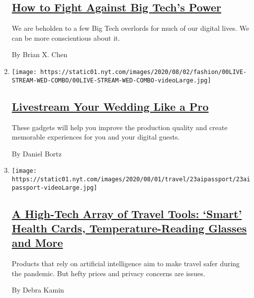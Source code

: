 \begin{enumerate}
  \hypertarget{how-to-fight-against-big-techs-power}{%
  \subsection{\texorpdfstring{\href{/2020/07/29/technology/personaltech/big-tech-power-how-to-fight.html}{How
  to Fight Against Big Tech's
  Power}}{How to Fight Against Big Tech's Power}}\label{how-to-fight-against-big-techs-power}}

  We are beholden to a few Big Tech overlords for much of our digital
  lives. We can be more conscientious about it.

  By Brian X. Chen
\item
  \texttt{[image: https://static01.nyt.com/images/2020/08/02/fashion/00LIVE-STREAM-WED-COMBO/00LIVE-STREAM-WED-COMBO-videoLarge.jpg]}

  \hypertarget{livestream-your-wedding-like-a-pro}{%
  \subsection{\texorpdfstring{\href{/2020/07/28/fashion/weddings/livestream-your-wedding-like-a-pro.html}{Livestream
  Your Wedding Like a
  Pro}}{Livestream Your Wedding Like a Pro}}\label{livestream-your-wedding-like-a-pro}}

  These gadgets will help you improve the production quality and create
  memorable experiences for you and your digital guests.

  By Daniel Bortz
\item
  \texttt{[image: https://static01.nyt.com/images/2020/08/01/travel/23aipassport/23aipassport-videoLarge.jpg]}

  \hypertarget{a-high-tech-array-of-travel-tools-smart-health-cards-temperature-reading-glasses-and-more}{%
  \subsection{\texorpdfstring{\href{/2020/07/23/travel/artificial-intelligence-coronavirus-passport.html}{A
  High-Tech Array of Travel Tools: `Smart' Health Cards,
  Temperature-Reading Glasses and
  More}}{A High-Tech Array of Travel Tools: `Smart' Health Cards, Temperature-Reading Glasses and More}}\label{a-high-tech-array-of-travel-tools-smart-health-cards-temperature-reading-glasses-and-more}}

  Products that rely on artificial intelligence aim to make travel safer
  during the pandemic. But hefty prices and privacy concerns are issues.

  By Debra Kamin
\end{enumerate}

